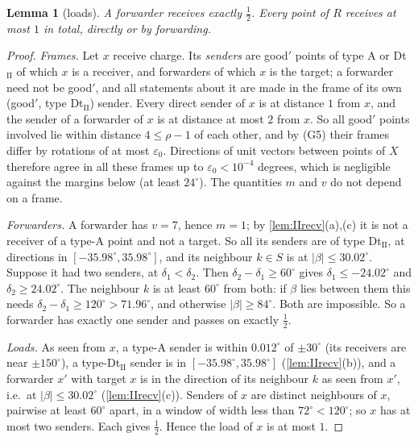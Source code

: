 \documentclass[11pt]{amsart}
\newtheorem{lemma}[theorem]{Lemma}
\theoremstyle{definition}
\theoremstyle{remark}
\newcommand{\eps}{\varepsilon}
\begin{document}
\begin{lemma}[loads]\label{lem:IIloads}
A forwarder receives exactly $\frac12$. Every point of $R$ receives at most $1$ in total, directly or by forwarding.
\end{lemma}
\begin{proof}
\emph{Frames.} Let $x$ receive charge. Its \emph{senders} are good$'$ points of type A or Dt$_{\mathrm{II}}$ of which $x$ is a receiver, and forwarders of which $x$ is the target; a forwarder need not be good$'$, and all statements about it are made in the frame of its own (good$'$, type Dt$_{\mathrm{II}}$) sender. Every direct sender of $x$ is at distance $1$ from $x$, and the sender of a forwarder of $x$ is at distance at most $2$ from $x$. So all good$'$ points involved lie within distance $4\le\rho-1$ of each other, and by (G5) their frames differ by rotations of at most $\eps_0$. Directions of unit vectors between points of $X$ therefore agree in all these frames up to $\eps_0<10^{-4}$ degrees, which is negligible against the margins below (at least $24^\circ$). The quantities $m$ and $v$ do not depend on a frame.

\emph{Forwarders.} A forwarder has $v=7$, hence $m=1$; by \cref{lem:IIrecv}(a),(c) it is not a receiver of a type-A point and not a target. So all its senders are of type Dt$_{\mathrm{II}}$, at directions in $[-35.98^\circ,35.98^\circ]$, and its neighbour $k\in S$ is at $|\beta|\le30.02^\circ$. Suppose it had two senders, at $\delta_1<\delta_2$. Then $\delta_2-\delta_1\ge60^\circ$ gives $\delta_1\le-24.02^\circ$ and $\delta_2\ge24.02^\circ$. The neighbour $k$ is at least $60^\circ$ from both: if $\beta$ lies between them this needs $\delta_2-\delta_1\ge120^\circ>71.96^\circ$, and otherwise $|\beta|\ge84^\circ$. Both are impossible. So a forwarder has exactly one sender and passes on exactly $\frac12$.

\emph{Loads.} As seen from $x$, a type-A sender is within $0.012^\circ$ of $\pm30^\circ$ (its receivers are near $\pm150^\circ$), a type-Dt$_{\mathrm{II}}$ sender is in $[-35.98^\circ,35.98^\circ]$ (\cref{lem:IIrecv}(b)), and a forwarder $x'$ with target $x$ is in the direction of its neighbour $k$ as seen from $x'$, i.e.\ at $|\beta|\le30.02^\circ$ (\cref{lem:IIrecv}(c)). Senders of $x$ are distinct neighbours of $x$, pairwise at least $60^\circ$ apart, in a window of width less than $72^\circ<120^\circ$; so $x$ has at most two senders. Each gives $\frac12$. Hence the load of $x$ is at most $1$.
\end{proof}
\end{document}
